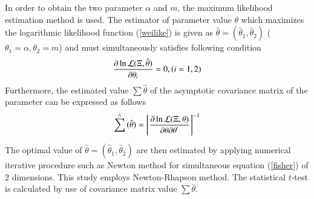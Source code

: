 \documentclass[a4paper,oneside,onecolumn,preprint,10pt,authoryear]{elsarticle}
\begin{document}
In order to obtain the two parameter $\alpha$ and $m$, the maximum likelihood estimation method is used. The estimator of parameter value $\theta$ which maximizes the logarithmic likelihood function (\ref{weilike}) is given as $\hat\theta =(\hat \theta _1 ,\hat\theta _2)$ ($\theta _1 =\alpha, \theta _2 =m $) and must simultaneously satisfies following condition
\begin{eqnarray}
\frac{{\partial \ln {\cal L} (\Xi ,\hat \theta )}}{{\partial \theta _i }} = 0,{\rm{      }}(i = 1,2) 
\end{eqnarray}
Furthermore, the estimated value $\sum {\hat \theta }$ of the asymptotic covariance matrix of the parameter can be expressed as follows
\begin{eqnarray}
\sum\limits_{}^ \wedge  {(\hat \theta ) = \left[ {\frac{{\partial \ln {\cal L} (\Xi ,\theta )}}{{\partial \theta \partial \theta^{'} }}} \right]} ^{ - 1}  \label{fisher}
\end{eqnarray}
The optimal value of $\hat\theta =(\hat \theta _1 ,\hat\theta _2)$ are then estimated by applying numerical iterative procedure such as Newton method for simultaneous equation (\ref{fisher}) of 2 dimensions. This study employs Newton-Rhapson method. The statistical $t$-test is calculated by use of covariance matrix value $\sum {\hat \theta }$.
\end{document}
